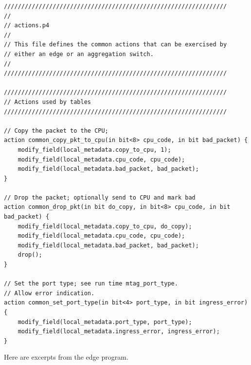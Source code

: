 \documentclass[12pt]{article}
\begin{document}
\begin{lstlisting}[style=P4style]
////////////////////////////////////////////////////////////////
//
// actions.p4
//
// This file defines the common actions that can be exercised by
// either an edge or an aggregation switch. 
//
////////////////////////////////////////////////////////////////

////////////////////////////////////////////////////////////////
// Actions used by tables
////////////////////////////////////////////////////////////////

// Copy the packet to the CPU;
action common_copy_pkt_to_cpu(in bit<8> cpu_code, in bit bad_packet) {
    modify_field(local_metadata.copy_to_cpu, 1);
    modify_field(local_metadata.cpu_code, cpu_code);
    modify_field(local_metadata.bad_packet, bad_packet);
}

// Drop the packet; optionally send to CPU and mark bad
action common_drop_pkt(in bit do_copy, in bit<8> cpu_code, in bit bad_packet) {
    modify_field(local_metadata.copy_to_cpu, do_copy);
    modify_field(local_metadata.cpu_code, cpu_code);
    modify_field(local_metadata.bad_packet, bad_packet);
    drop();
}

// Set the port type; see run time mtag_port_type. 
// Allow error indication.
action common_set_port_type(in bit<4> port_type, in bit ingress_error) {
    modify_field(local_metadata.port_type, port_type);
    modify_field(local_metadata.ingress_error, ingress_error);
}
\end{lstlisting}

Here are excerpts from the edge program.
\end{document}
